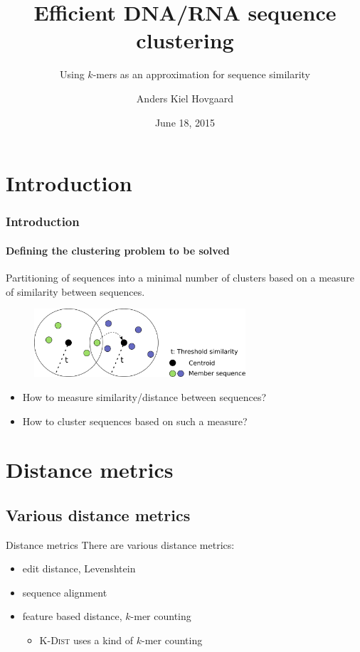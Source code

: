 \documentclass{beamer}
\title{Efficient DNA/RNA sequence clustering}
\subtitle{Using $k$-mers as an approximation for sequence similarity}
\author{Anders Kiel Hovgaard}
\institute{Department of Computer Science, University of Copenhagen}
\date{June 18, 2015}
\begin{document}
\frame{\titlepage}

\section{Introduction}

\begin{frame}
  \frametitle{Introduction}
  \framesubtitle{Defining the clustering problem to be solved}

  Partitioning of sequences into a minimal number of clusters based on a
  measure of similarity between sequences.

  \begin{figure}
    \includegraphics[width=0.7\textwidth]{graphics/centroid-clustering.pdf}
  \end{figure}

  \begin{itemize}
    \item How to measure similarity/distance between sequences?
    \item How to cluster sequences based on such a measure?
  \end{itemize}
\end{frame}

\section{Distance metrics}
\subsection{Various distance metrics}

\begin{frame}{Distance metrics}
  There are various distance metrics:

  \begin{itemize}
    \item edit distance, Levenshtein
    \item sequence alignment
    \item feature based distance, $k$-mer counting
      \begin{itemize}
        \item \textsc{K-Dist} uses a kind of $k$-mer counting
      \end{itemize}
  \end{itemize}
\end{frame}
\end{document}
